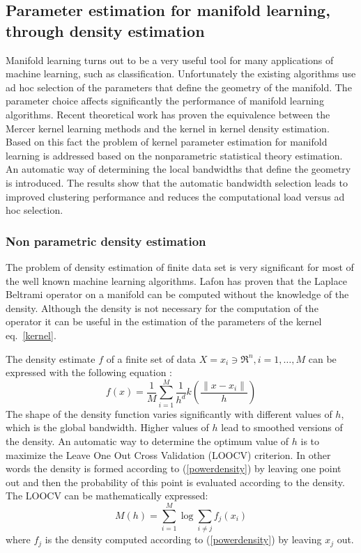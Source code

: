 \documentclass[12pt,letterpaper,doublespaced,ETD,dvips,proposal]{gtthesis}
\begin{document}
\begin{Body}
\subsection{Parameter estimation for manifold learning, through density estimation}
\label{Bandwidth_Tuning}
Manifold learning turns out to be a very useful tool for many
applications of machine learning, such as classification.
Unfortunately the existing algorithms use ad hoc selection of the
parameters that define the geometry of the manifold. The parameter
choice affects significantly the performance of manifold learning
algorithms. Recent theoretical work has proven the equivalence
between the Mercer kernel learning methods and the kernel in kernel
density estimation. Based on this fact the problem of kernel
parameter estimation for manifold learning is addressed based on the
nonparametric statistical theory estimation. An automatic way of
determining the local bandwidths that define the geometry is
introduced. The results show that the automatic bandwidth selection
leads to improved clustering performance and reduces the
computational load versus ad hoc selection.

\subsubsection{Non parametric  density estimation} The problem of
density estimation of finite data set is very significant for most
of the well known machine learning algorithms. Lafon has proven that
the Laplace Beltrami operator on a manifold can be computed without
the knowledge of the density. Although the density is not necessary
for the computation of the operator it can be useful in the
estimation of the parameters of the kernel eq.~\ref{kernel}.

The  density estimate $f$ of a finite set of data $X={x_i\ni
\Re^n,i=1,\dots,M}$ can be expressed with the following equation
\cite{Silverman}:
\begin{equation}\label{powerdensity}
    f(x)=\frac{1}{M}\sum_{i=1}^{M}\frac{1}{h^d}k\left(\frac{\parallel x-x_i
\parallel}{h}\right)
\end{equation}
The shape of the density function varies significantly with
different values of $h$, which is the global bandwidth. Higher
values of $h$ lead to smoothed versions of the  density. An
automatic way to determine the optimum value of $h$ is to maximize
the Leave One Out Cross Validation (LOOCV) criterion. In other words
the density is formed according to (\ref{powerdensity}) by leaving
one point out and then the probability of this point is evaluated
according to the density. The LOOCV can be mathematically expressed:
\begin{equation}
    M(h)=\sum_{i=1}^{M}\log\sum_{i\neq j}f_j(x_i)
\end{equation}
where $f_j$ is the density computed according to
(\ref{powerdensity}) by leaving $x_j$ out.


\end{Body}
\end{document}
